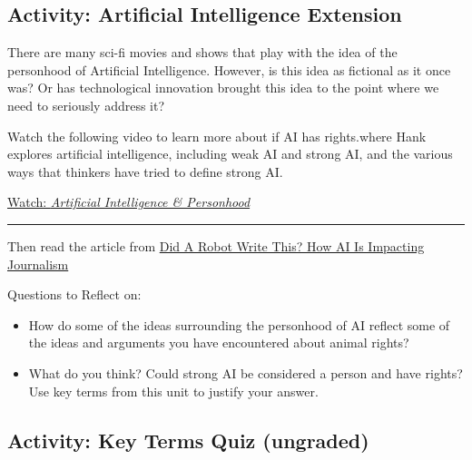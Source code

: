 \documentclass[
]{book}
\providecommand{\tightlist}{%
  \setlength{\itemsep}{0pt}\setlength{\parskip}{0pt}}
\begin{document}
\hypertarget{activity-artificial-intelligence-extension}{%
\subsection*{Activity: Artificial Intelligence Extension}\label{activity-artificial-intelligence-extension}}

\begin{reflect}
There are many sci-fi movies and shows that play with the idea of the personhood of Artificial Intelligence. However, is this idea as fictional as it once was? Or has technological innovation brought this idea to the point where we need to seriously address it?

Watch the following video to learn more about if AI has rights.where Hank explores artificial intelligence, including weak AI and strong AI, and the various ways that thinkers have tried to define strong AI.

\href{https://www.youtube.com/watch?v=39EdqUbj92U}{Watch: \emph{Artificial Intelligence \& Personhood}}

\begin{center}\rule{0.5\linewidth}{0.5pt}\end{center}

Then read the article from \href{https://www.forbes.com/sites/nicolemartin1/2019/02/08/did-a-robot-write-this-how-ai-is-impacting-journalism/?sh=286bd4eb7795}{Did A Robot Write This? How AI Is Impacting Journalism}

{Questions to Reflect on:}

\begin{itemize}
\tightlist
\item
  How do some of the ideas surrounding the personhood of AI reflect some of the ideas and arguments you have encountered about animal rights?
\item
  What do you think? Could strong AI be considered a person and have rights? Use key terms from this unit to justify your answer.
\end{itemize}
\end{reflect}

\hypertarget{activity-key-terms-quiz-ungraded-4}{%
\subsection*{Activity: Key Terms Quiz (ungraded)}\label{activity-key-terms-quiz-ungraded-4}}
\end{document}
